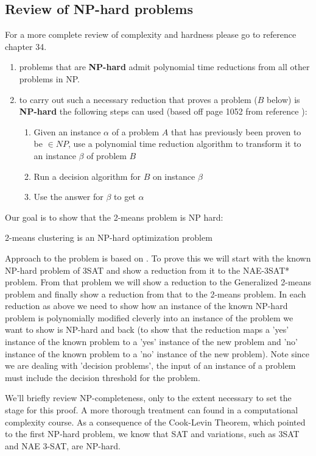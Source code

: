 \subsection{Review of NP-hard problems}
For a more complete review of complexity and hardness please go to
reference \cite{cor2009} chapter 34. 
\begin{enumerate}
\item problems that are \textbf{NP-hard} admit polynomial time
  reductions from all other problems in NP.
\item to carry out such a necessary reduction that proves a problem
  ($B$ below) is \textbf{NP-hard} the following steps can used (based
  off page 1052 from reference \cite{cor2009}): 
\begin{enumerate}
\item Given an instance $\alpha$ of a problem $A$ that has previously
  been proven to be $\in NP$, use a polynomial time reduction
  algorithm to transform it to an instance $\beta$ of problem $B$ 
\item Run a decision algorithm for $B$ on instance $\beta$ 
\item Use the answer for $\beta$ to get $\alpha$
\end{enumerate} 
\end{enumerate} 

Our goal is to show that the 2-means problem is NP hard:
\begin{theorem}\label{2-means-np-hard}
2-means clustering is an NP-hard optimization problem
\end{theorem} 

Approach to the problem is based on \cite{das2008}.  To prove this we
will start with the known NP-hard problem of 3SAT and show a reduction
from it to the NAE-3SAT* problem.  From that problem we will show a
reduction to the Generalized 2-means problem and finally show a
reduction from that to the 2-means problem.  In each reduction as
above we need to show how an instance of the known NP-hard problem is
polynomially modified cleverly into an instance of the problem we want
to show is NP-hard and back (to show that the reduction maps a 'yes'
instance of the known problem to a 'yes' instance of the new problem
and 'no' instance of the known problem to a 'no' instance of the new
problem).  Note since we are dealing with 'decision problems', the
input of an instance of a problem must include the decision threshold
for the problem.


We'll briefly review NP-completeness, only to the extent necessary to
set the stage for this proof.  A more thorough treatment can found in
a computational complexity course. As a consequence of the Cook-Levin
Theorem, which pointed to the first NP-hard problem, we know that SAT
and variations, such as 3SAT and NAE 3-SAT, are NP-hard.


